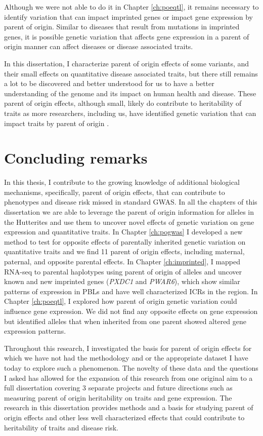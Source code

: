 Although we were not able to do it in Chapter \ref{ch:poeqtl}, it remains necessary to identify variation that can impact imprinted genes or impact gene expression by parent of origin. Similar to diseases that result from mutations in imprinted genes, it is possible genetic variation that affects gene expression in a parent of origin manner can affect diseases or disease associated traits. 

In this dissertation, I characterize parent of origin effects of some variants, and their small effects on quantitative disease associated traits, but there still remains a lot to be discovered and better understood for us to have a better understanding of the genome and its impact on human health and disease. These parent of origin effects, although small, likely do contribute to heritability of traits as more researchers, including us, have identified genetic variation that can impact traits by parent of origin \cite{Benonisdottir:2016dz,Zoledziewska:2015do,Garg2012a,Kong:2009kk}. 


\section{Concluding remarks}

In this thesis, I contribute to the growing knowledge of additional biological mechanisms, specifically, parent of origin effects, that can contribute to phenotypes and disease risk missed in standard GWAS. In all the chapters of this dissertation we are able to leverage the parent of origin information for alleles in the Hutterites and use them to uncover novel effects of genetic variation on gene expression and quantitative traits. In Chapter \ref{ch:pogwas} I developed a new method to test for opposite effects of parentally inherited genetic variation on quantitative traits and we find 11 parent of origin effects, including maternal, paternal, and opposite parental effects. In Chapter \ref{ch:imprinted}, I mapped RNA-seq to parental haplotypes using parent of origin of alleles and uncover known and new imprinted genes (\emph{PXDC1} and \emph{PWAR6}), which show similar patterns of expression in PBLs and have well characterized ICRs in the region. In Chapter \ref{ch:poeqtl}, I explored how parent of origin genetic variation could influence gene expression. We did not find any opposite effects on gene expression but identified alleles that when inherited from one parent showed altered gene expression patterns. 

Throughout this research, I investigated the basis for parent of origin effects for which we have not had the methodology and or the appropriate dataset I have today to explore such a phenomenon. The novelty of these data and the questions I asked  has allowed for the expansion of this research from one original aim to a full dissertation covering 3 separate projects and future directions such as measuring parent of origin heritability on traits and gene expression. The research in this dissertation provides methods and a basis for studying parent of origin effects and other less well characterized effects that could contribute to heritability of traits and disease risk. 




